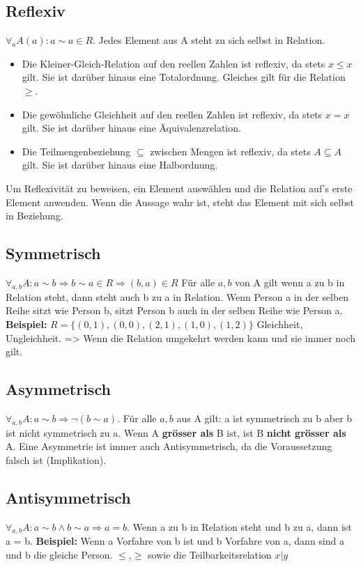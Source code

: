 \subsection{Reflexiv}
\( \forall_a A(a): a \sim a \in R \). Jedes Element aus A steht zu sich selbst in Relation.
\begin{itemize}
	\item Die Kleiner-Gleich-Relation auf den reellen Zahlen ist reflexiv, da stets \(x \leq x \) gilt. Sie ist darüber hinaus eine Totalordnung. Gleiches gilt für die Relation \( \geq \).
	\item Die gewöhnliche Gleichheit auf den reellen Zahlen ist reflexiv, da stets \(x = x\) gilt. Sie ist darüber hinaus eine Äquivalenzrelation.
	\item Die Teilmengenbeziehung \(\subseteq \) zwischen Mengen ist reflexiv, da stets \(A \subseteq A\) gilt. Sie ist darüber hinaus eine Halbordnung.
\end{itemize}
    Um Reflexivität zu beweisen, ein Element auswählen und die Relation
    auf's erste Element anwenden. Wenn die Aussage wahr ist, steht das
    Element mit sich selbst in Beziehung.

\subsection{Symmetrisch}
\( \forall_{a,b} A: a \sim b \Rightarrow b \sim a \in R \Rightarrow (b,a) \in R \) \newline
Für alle \(a,b\) von A gilt wenn a zu b in Relation steht, dann steht auch b zu a in Relation. \newline
Wenn Person a in der selben Reihe sitzt wie Person b, sitzt Person b auch in der selben Reihe wie Person a.
\textbf{Beispiel:} \( R = \{(0,1),(0,0),(2,1),(1,0),(1,2) \} \)
    \newline Gleichheit, Ungleichheit.
	=> Wenn die Relation umgekehrt werden kann und sie immer noch gilt.
	
\subsection{Asymmetrisch}
\( \forall_{a,b} A: a \sim b \Rightarrow \neg (b \sim a) \). Für alle
    \(a,b\) aus A gilt: a ist symmetrisch zu b aber b ist nicht symmetrisch zu a.
    Wenn A \textbf{grösser als} B ist, ist B \textbf{nicht grösser als} A. Eine Asymmetrie
    ist immer auch Antisymmetrisch, da die Voraussetzung falsch ist
    (Implikation).

\subsection{Antisymmetrisch}
\(\forall_{a,b} A: a \sim b \wedge b \sim a \Rightarrow a = b \). Wenn a zu b in Relation steht und b zu a, dann ist a = b.\newline
\textbf{Beispiel:} Wenn a Vorfahre von b ist und b Vorfahre von a, dann
    sind a und b die gleiche Person.\newline
    \(\leq\),\(\geq\) sowie die Teilbarkeitsrelation \(x | y\)

